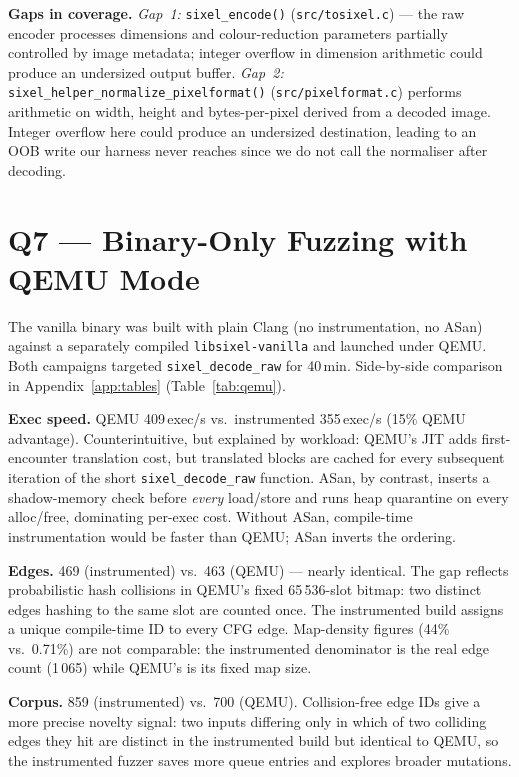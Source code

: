 \documentclass[letterpaper,twocolumn,10pt]{article}
\begin{document}
\textbf{Gaps in coverage.} \emph{Gap~1:} \texttt{sixel\_encode()}
(\texttt{src/tosixel.c}) --- the raw encoder processes dimensions and
colour-reduction parameters partially controlled by image metadata; integer
overflow in dimension arithmetic could produce an undersized output buffer.
\emph{Gap~2:} \texttt{sixel\_helper\_normalize\_pixelformat()}
(\texttt{src/pixelformat.c}) performs arithmetic on width, height and
bytes-per-pixel derived from a decoded image. Integer overflow here could
produce an undersized destination, leading to an OOB write our harness never
reaches since we do not call the normaliser after decoding.

\section{Q7 --- Binary-Only Fuzzing with QEMU Mode}

The vanilla binary was built with plain Clang (no instrumentation, no ASan)
against a separately compiled \texttt{libsixel-vanilla} and launched under
QEMU. Both campaigns targeted \texttt{sixel\_decode\_raw} for 40\,min.
Side-by-side comparison in Appendix~\ref{app:tables} (Table~\ref{tab:qemu}).

\textbf{Exec speed.} QEMU 409\,exec/s vs.\ instrumented 355\,exec/s
(15\% QEMU advantage). Counterintuitive, but explained by workload: QEMU's JIT
adds first-encounter translation cost, but translated blocks are cached for
every subsequent iteration of the short \texttt{sixel\_decode\_raw} function.
ASan, by contrast, inserts a shadow-memory check before \emph{every} load/store
and runs heap quarantine on every alloc/free, dominating per-exec cost.
Without ASan, compile-time instrumentation would be faster than QEMU; ASan
inverts the ordering.

\textbf{Edges.} 469 (instrumented) vs.\ 463 (QEMU) --- nearly identical. The
gap reflects probabilistic hash collisions in QEMU's fixed 65\,536-slot
bitmap: two distinct edges hashing to the same slot are counted once. The
instrumented build assigns a unique compile-time ID to every CFG edge.
Map-density figures (44\% vs.\ 0.71\%) are not comparable: the instrumented
denominator is the real edge count (1\,065) while QEMU's is its fixed map size.

\textbf{Corpus.} 859 (instrumented) vs.\ 700 (QEMU). Collision-free edge IDs
give a more precise novelty signal: two inputs differing only in which of two
colliding edges they hit are distinct in the instrumented build but identical
to QEMU, so the instrumented fuzzer saves more queue entries and explores
broader mutations.
\end{document}
